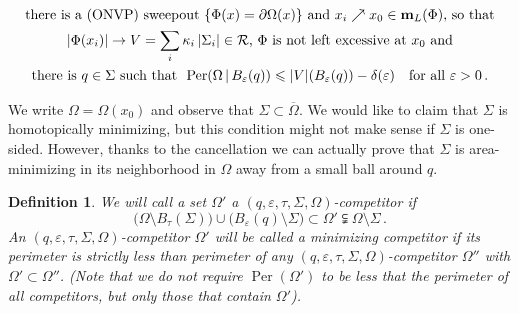 \documentclass[12pt,twoside]{amsart}
\numberwithin{equation}{section}
\renewcommand{\leq}{\leqslant}
\newtheorem{lemma}[theorem]{Lemma}
\newtheorem{definition}[theorem]{Definition}
\renewcommand{\cR}{\mathcal R}
\newcommand{\mm}{{\bf m}}
\DeclareMathOperator{\Per}{Per}
\newcommand{\eps}{\varepsilon}
\begin{document}
\begin{equation}
\label{e:canc}
\begin{gathered}
\text{there is a (ONVP) sweepout $\{\Phi(x)=\partial \Omega(x)\}$ and $x_i \nearrow x_0 \in \mm_L(\Phi)$, so that} \\
\text{$|\Phi(x_i)| \to V=\sum_{i} \kappa_i\,|\Sigma_i|\in\cR$, $\Phi$ is not left excessive at $x_0$ and} \\
\text{there is $q\in \Sigma$ such that }\, \Per(\Omega\,|\,B_\eps(q)) \leq | V |(B_\eps(q))-\delta(\eps) \quad \text{for all } \eps>0\,.
\end{gathered}
\end{equation}

We write $\Omega=\Omega(x_0)$ and observe that $\Sigma\subset \overline\Omega$. We would like to claim that $\Sigma$ is homotopically minimizing, but this condition might not make sense if $\Sigma$ is one-sided. However, thanks to the cancellation we can actually prove 
that $\Sigma$ is area-minimizing in its neighborhood in $\Omega$
away from a small ball around $q$.


\begin{definition} \label{def:nbhd minimizing}
We will call a set $\Omega'$ a $(q,\eps, \tau, \Sigma, \Omega)$-competitor
if $$\big(\Omega \setminus B_\tau(\Sigma)\big)  \cup \big(B_\eps(q) \setminus \Sigma \big) 
\subset \Omega' \subsetneqq 
\Omega \setminus \Sigma \, .$$
An $(q,\eps, \tau, \Sigma, \Omega)$-competitor $\Omega'$ will be called a
minimizing competitor if 
its perimeter is strictly less than perimeter of any 
$(q,\eps, \tau, \Sigma, \Omega)$-competitor $\Omega''$ 
with $\Omega' \subset \Omega''$.
(Note that we do not require $\Per (\Omega')$ to 
be less that the perimeter of all competitors, but
only those that contain $\Omega'$).
\end{definition}


\end{document}
